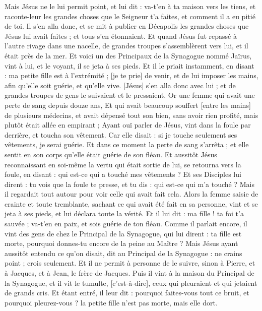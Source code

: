 \begin{multicols}{2}
Mais Jésus ne le lui permit point, et lui dit : va-t'en à ta maison vers les tiens, et raconte-leur les grandes choses que le Seigneur t'a faites, et comment il a eu pitié de toi.
Il s'en alla donc, et se mit à publier en Décapolis les grandes choses que Jésus lui avait faites ; et tous s'en étonnaient.
Et quand Jésus fut repassé à l'autre rivage dans une nacelle, de grandes troupes s'assemblèrent vers lui, et il était près de la mer.
Et voici un des Principaux de la Synagogue nommé Jaïrus, vint à lui, et le voyant, il se jeta à ses pieds.
Et il le priait instamment, en disant : ma petite fille est à l'extrémité ; [je te prie] de venir, et de lui imposer les mains, afin qu'elle soit guérie, et qu'elle vive.
[Jésus] s'en alla donc avec lui ; et de grandes troupes de gens le suivaient et le pressaient.
Or une femme qui avait une perte de sang depuis douze ans,
Et qui avait beaucoup souffert [entre les mains] de plusieurs médecins, et avait dépensé tout son bien, sans avoir rien profité, mais plutôt était allée en empirant ;
Ayant ouï parler de Jésus, vint dans la foule par derrière, et toucha son vêtement.
Car elle disait : si je touche seulement ses vêtements, je serai guérie.
Et dans ce moment la perte de sang s'arrêta ; et elle sentit en son corps qu'elle était guérie de son fléau.
Et aussitôt Jésus reconnaissant en soi-même la vertu qui était sortie de lui, se retourna vers la foule, en disant : qui est-ce qui a touché mes vêtements ?
Et ses Disciples lui dirent : tu vois que la foule te presse, et tu dis : qui est-ce qui m'a touché ?
Mais il regardait tout autour pour voir celle qui avait fait cela.
Alors la femme saisie de crainte et toute tremblante, sachant ce qui avait été fait en sa personne, vint et se jeta à ses pieds, et lui déclara toute la vérité.
Et il lui dit : ma fille ! ta foi t'a sauvée ; va-t'en en paix, et sois guérie de ton fléau.
Comme il parlait encore, il vint des gens de chez le Principal de la Synagogue, qui lui dirent : ta fille est morte, pourquoi donnes-tu encore de la peine au Maître ?
Mais Jésus ayant aussitôt entendu ce qu'on disait, dit au Principal de la Synagogue : ne crains point ; crois seulement.
Et il ne permit à personne de le suivre, sinon à Pierre, et à Jacques, et à Jean, le frère de Jacques.
Puis il vint à la maison du Principal de la Synagogue, et il vit le tumulte, [c'est-à-dire], ceux qui pleuraient et qui jetaient de grands cris.
Et étant entré, il leur dit : pourquoi faites-vous tout ce bruit, et pourquoi pleurez-vous ? la petite fille n'est pas morte, mais elle dort.

\end{multicols}
